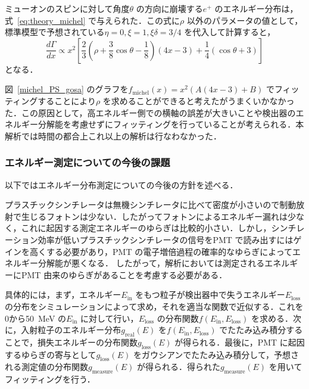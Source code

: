 ミューオンのスピンに対して角度$\theta$ の方向に崩壊する$e^{+}$ のエネルギー分布は，式~\ref{eq:theory_michel} で与えられた．この式に$\rho$ 以外のパラメータの値として，標準模型で予想されている$\eta = 0 , \xi = 1 , \xi \delta = 3/4$ を代入して計算すると，
\[\frac{d\Gamma}{dx} \propto x^{2} [\frac{2}{3}(\rho + \frac{3}{8}\cos \theta - \frac{1}{8})(4x-3) + \frac{1}{4}(\cos \theta + 3)]\]
となる．

図~\ref{michel_PS_gosa} のグラフを$f_{\mathrm{michel}}(x) = x^{2} (A(4x -3) + B)$ でフィッティングすることにより$\rho$ を求めることができると考えたがうまくいかなかった．この原因として，高エネルギー側での横軸の誤差が大きいことや検出器のエネルギー分解能を考慮せずにフィッティングを行っていることが考えられる．本解析では時間の都合上これ以上の解析は行なわなかった．

\subsubsection{エネルギー測定についての今後の課題}
以下ではエネルギー分布測定についての今後の方針を述べる．

プラスチックシンチレータは無機シンチレータに比べて密度が小さいので制動放射で生じるフォトンは少ない．したがってフォトンによるエネルギー漏れは少なく，これに起因する測定エネルギーのゆらぎは比較的小さい．しかし，シンチレーション効率が低いプラスチックシンチレータの信号をPMT で読み出すにはゲインを高くする必要があり，PMT の電子増倍過程の確率的なゆらぎによってエネルギー分解能が悪くなる．
したがって，解析においては測定されるエネルギーにPMT 由来のゆらぎがあることを考慮する必要がある．

具体的には，まず，エネルギー$E_\mathrm{in}$ をもつ粒子が検出器中で失うエネルギー$E_\mathrm{loss}$ の分布をシミュレーションによって求め，それを適当な関数で近似する．これを0から50~MeV の$E_\mathrm{in}$ に対して行い，$E_\mathrm{loss}$ の分布関数$f(E_\mathrm{in}, E_\mathrm{loss})$ を求める．次に，入射粒子のエネルギー分布$g_{\mathrm{real}}(E)$ を$f(E_\mathrm{in}, E_\mathrm{loss})$ でたたみ込み積分することで，損失エネルギーの分布関数$g_{\mathrm{loss}}(E)$ が得られる．最後に，PMT に起因するゆらぎの寄与として$g_{\mathrm{loss}}(E)$ をガウシアンでたたみ込み積分して，予想される測定値の分布関数$g_{\mathrm{measure}}(E)$ が得られる．得られた$g_{\mathrm{measure}}(E)$ を用いてフィッティングを行う．
  
